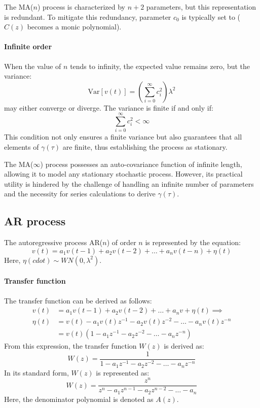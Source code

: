 The MA($n$) process is characterized by $n+2$ parameters, but this representation is redundant. 
To mitigate this redundancy, parameter $c_0$ is typically set to ($C(z)$ becomes a monic polynomial).

\paragraph*{Infinite order}
When the value of $n$ tends to infinity, the expected value remains zero, but the variance:
\[\text{Var}\left[v(t)\right]=\left( \sum_{i=0}^\infty c_{i}^{2}\right) \lambda^2\]
may either converge or diverge. 
The variance is finite if and only if:
\[\sum_{i=0}^\infty c_i^2 < \infty\]
This condition not only ensures a finite variance but also guarantees that all elements of $\gamma(\tau)$ are finite, thus establishing the process as stationary.

The MA($\infty$) process possesses an auto-covariance function of infinite length, allowing it to model any stationary stochastic process. 
However, its practical utility is hindered by the challenge of handling an infinite number of parameters and the necessity for series calculations to derive $\gamma(\tau)$. 

\subsection{AR process}
The autoregressive process AR($n$) of order $n$ is represented by the equation:
\[v(t)=a_1v(t-1)+a_2v(t-2)+\dots+a_nv(t-n)+\eta(t)\]
Here, $\eta(cdot)\sim WN(0,\lambda^2)$. 

\paragraph*{Transfer function}
The transfer function can be derived as follows:
\begin{align*}
    v(t)    &= a_1v(t-1)+a_2v(t-2)+\dots+a_nv+\eta(t) \implies \\
    \eta(t) &= v(t) - a_1v(t)z^{-1} - a_2v(t)z^{-2} - \dots - a_nv(t)z^{-n} \\
            &= v(t)\left( 1 - a_1z^{-1} - a_2z^{-2} - \dots - a_nz^{-n}\right) 
\end{align*}
From this expression, the transfer function $W(z)$ is derived as:
\[W(z)=\dfrac{1}{1 - a_1z^{-1} - a_2z^{-2} - \dots - a_nz^{-n}}\]
In its standard form, $W(z)$ is represented as:
\[W(z)=\dfrac{z^n}{z^n - a_1z^{n-1} - a_2z^{n-2} - \dots - a_n}\]
Here, the denominator polynomial is denoted as $A(z)$. 


